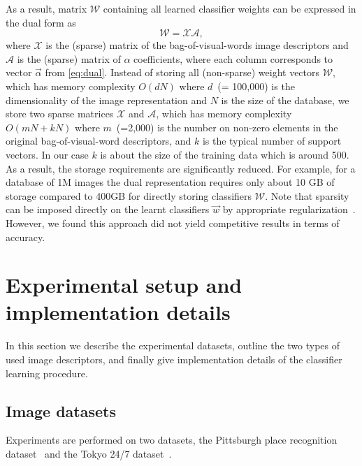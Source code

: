     As a result, matrix $\mathcal{W}$ containing all learned classifier weights can be expressed in the dual form as
      \begin{equation}
        \label{eq:dualFinal}
        \mathcal{W} = \mathcal{X} \mathcal{A},  
      \end{equation}
    \noindent
    where $\mathcal{X}$ is the (sparse) matrix of the bag-of-visual-words image descriptors and $\mathcal{A}$ is the (sparse) matrix of $\alpha$ coefficients, 
    where each column corresponds to vector $\vec{\alpha}$ from \eqref{eq:dual}. 
    Instead of storing all (non-sparse) weight vectors $\mathcal{W}$, which has memory complexity $O(dN)$ where $d$~(= 100,000) is the dimensionality of the image representation and $N$ is the size of the database, we store two sparse matrices $\mathcal{X}$ and $\mathcal{A}$, which has memory complexity $O(mN+kN)$ where $m$~(=2,000) is the number on non-zero elements in the original bag-of-visual-word descriptors, and $k$ is the typical number of support vectors. In our case $k$ is about the size of the training data which is around 500. As a result, the storage requirements are significantly reduced. For example, for a database of 1M images the dual representation requires only about 10 GB of storage compared to 400GB for directly storing classifiers $\mathcal{W}$.  
    Note that sparsity can be imposed directly on the learnt classifiers $\vec{w}$ by appropriate regularization~\cite{scholkopf2002learning}. However, we found this approach did not yield competitive results {in terms of accuracy}.


\section{Experimental setup and implementation details}
\label{sec:experiments}
  In this section we describe the experimental datasets, outline the two types of used image descriptors, and finally give implementation details of the classifier learning procedure.
  

  \subsection{Image datasets}
    {
      Experiments are performed on two datasets, the Pittsburgh place recognition dataset~\cite{Gronat13} and the Tokyo 24/7 dataset~\cite{Torii2015}. 
    }
